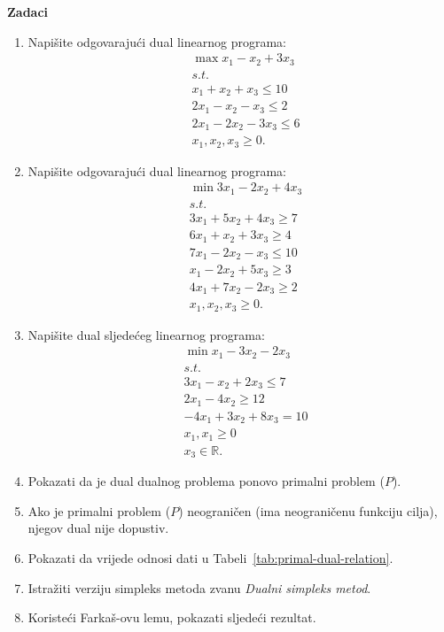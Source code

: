 \documentclass[a4paper, utf8, 11pt, colorlinks]{book}
\begin{document}
\vspace{1.5cm}
\textbf{\large Zadaci}
\begin{enumerate}
	\item %
	Napišite odgovarajući dual linearnog programa:
	\begin{align*}
		 &\max x_1 - x_2 + 3 x_3 \\
		 & s.t. \\
		 & x_1 + x_2 + x_3 \leq 10 \\
		 & 2x_1 - x_2 - x_3 \leq 2 \\
		 & 2x_1 - 2x_2 - 3 x_3 \leq 6 \\
		 & x_1, x_2, x_3 \geq 0.
	\end{align*}
 \item    	Napišite odgovarajući dual linearnog programa:
      \begin{align*}
      	  &\min 3 x_1 - 2 x_2 + 4 x_3 \\
      	  & s.t. \\
      	  & 3x_1 + 5 x_2 + 4 x_3 \geq 7 \\
      	  & 6 x_1 + x_2 + 3 x_3 \geq 4 \\
      	  & 7 x_1 - 2 x_2 - x_3 \leq 10 \\
      	  & x_1 - 2 x_2 + 5 x_3 \geq 3 \\
      	  & 4 x_1 + 7 x_2 - 2 x_3 \geq 2 \\
      	  & x_1, x_2, x_3 \geq 0.
      \end{align*}
  \item Napišite dual sljedećeg linearnog programa:
  \begin{align*}
        &\min x_1 - 3 x_2 - 2 x_3 \\
        & s.t. \\
        & 3 x_1 - x_2 + 2 x_3 \leq 7 \\
        & 2 x_1 - 4 x_2 \geq 12 \\
        & -4x_1 + 3x_2 + 8 x_3 = 10 \\
        & x_1, x_1 \geq 0 \\
        & x_3 \in \mathbb{R}. 
  \end{align*}
\item %
Pokazati da je dual dualnog problema ponovo primalni problem ($P$).
\item Ako je primalni problem ($P$) neograničen (ima neograničenu funkciju cilja), njegov dual nije dopustiv.
\item Pokazati da vrijede odnosi dati u Tabeli~\ref{tab:primal-dual-relation}.
\item Istražiti verziju simpleks metoda zvanu \emph{Dualni simpleks metod}.
\item Koristeći Farkaš-ovu lemu, pokazati sljedeći rezultat. 
 

\end{enumerate}
\end{document}
